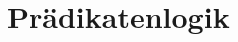 \documentclass[handout,aspectratio=1610,dvipsnames]{beamer}
\begin{document}
  \section[Prädikatenlogik]{Prädikatenlogik}
  \let\woopsi\section\let\section\subsection\let\subsection\subsubsection
  
  \let\subsection\section\let\section\woopsi
\end{document}
